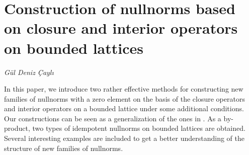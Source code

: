 \documentclass[../booklet.tex]{subfiles}
\begin{document}
\section[Construction of nullnorms based on closure and interior operators on bounded lattices. {\it Gül Deniz Çaylı}]{Construction of nullnorms based on closure and interior operators on bounded lattices}

\begin{center}
  {\it Gül Deniz Çaylı}
\end{center}

\vskip 0.8cm


In this paper, we introduce two rather effective methods for constructing new families of nullnorms
with a zero element on the basis of the closure operators and interior operators on a
bounded lattice under some additional conditions. Our constructions can be seen as a
generalization of the ones in \cite{wang}. As a by-product, two types of idempotent nullnorms
on bounded lattices are obtained. Several interesting examples are included to get a better
understanding of the structure of new families of nullnorms.

\end{document}
